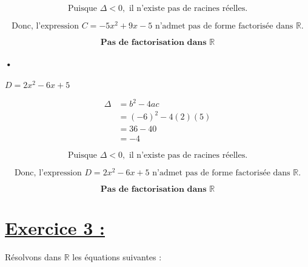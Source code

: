 \documentclass[12pt,a4paper]{article}
\begin{document}
\begin{enumerate}
\[
\text{Puisque } \Delta < 0, \text{ il n'existe pas de racines réelles.}
\]

\[
\text{Donc, l'expression } C = -5x^2 + 9x - 5 \text{ n'admet pas de forme factorisée dans } \mathbb{R}.
\]

\begin{tcolorbox}[colback=yellow!20, colframe=black, sharp corners]
    \[
    \mathbf{\text{Pas de factorisation dans } \mathbb{R}}
    \]
\end{tcolorbox}

\paragraph{•}
\(
D = 2x^2 - 6x + 5
\)

\[
\begin{aligned}
\Delta &= b^2 - 4ac \\
       &= (-6)^2 - 4(2)(5) \\
       &= 36 - 40 \\
       &= -4
\end{aligned}
\]

\[
\text{Puisque } \Delta < 0, \text{ il n'existe pas de racines réelles.}
\]

\[
\text{Donc, l'expression } D = 2x^2 - 6x + 5 \text{ n'admet pas de forme factorisée dans } \mathbb{R}.
\]

\begin{tcolorbox}[colback=yellow!20, colframe=black, sharp corners]
    \[
    \mathbf{\text{Pas de factorisation dans } \mathbb{R}}
    \]
\end{tcolorbox}

\end{enumerate}

\section*{\underline{Exercice 3 :}}

Résolvons dans \( \mathbb{R} \) les équations suivantes :
\end{document}
